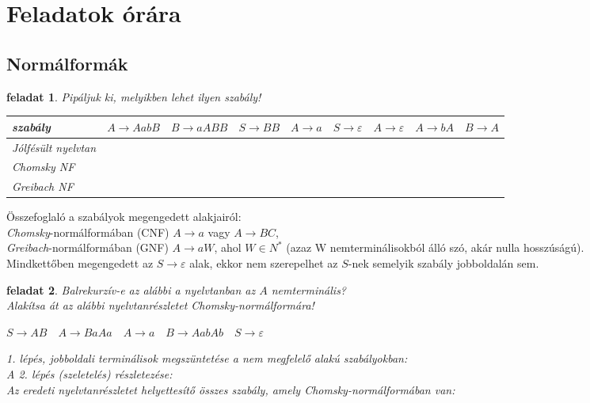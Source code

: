 \documentclass[a4paper]{article}
\newtheorem{feladat}{feladat}[section]
\begin{document}
\newpage
\section{Feladatok órára}
\subsection{Normálformák}

\begin{feladat}{}
    Pipáljuk ki, melyikben lehet ilyen szabály!

    \begin{tabular}{l*{8}{r}}
	szabály&
	$A\rightarrow AabB$&
	$B\rightarrow aABB$&
	$S\rightarrow BB$&
	$A\rightarrow a$&
	$S\rightarrow \varepsilon$&
	$A\rightarrow \varepsilon$&
	$A\rightarrow bA$&
	$B\rightarrow A$\\
	\hline
	Jólfésült nyelvtan&&&&&&&&\\
	Chomsky NF&&&&&&&&\\
	Greibach NF&&&&&&&&\\
	\hline
    \end{tabular}
\end{feladat}

Összefoglaló a szabályok megengedett alakjairól:\\
\emph{Chomsky}-normálformában (CNF) $A\rightarrow a$ vagy $A\rightarrow BC$,\\
\emph{Greibach}-normálformában (GNF) $A\rightarrow aW$, ahol $W \in
N^{*}$ (azaz W nemterminálisokból álló szó, akár nulla hosszúságú).\\
Mindkettőben megengedett az $S\rightarrow \varepsilon$ alak, ekkor nem
szerepelhet az $S$-nek semelyik szabály jobboldalán sem.
\begin{feladat}{}
    Balrekurzív-e az alábbi a nyelvtanban az $A$ nemterminális?\\[2em]
    Alakítsa át az alábbi nyelvtanrészletet Chomsky-normálformára!

    $S\rightarrow AB\quad
    A\rightarrow BaAa\quad
    A\rightarrow a\quad
    B\rightarrow AabAb\quad
    S\rightarrow \varepsilon$

    1. lépés, jobboldali terminálisok megszüntetése a nem megfelelő
    alakú szabályokban:\\[10em]

    A 2. lépés (szeletelés) részletezése:\\[15em]

    Az eredeti nyelvtanrészletet helyettesítő összes szabály, amely
    Chomsky-normálformában van:\\[10em]
\end{feladat}

\newpage

\newpage
\tableofcontents
\end{document}
